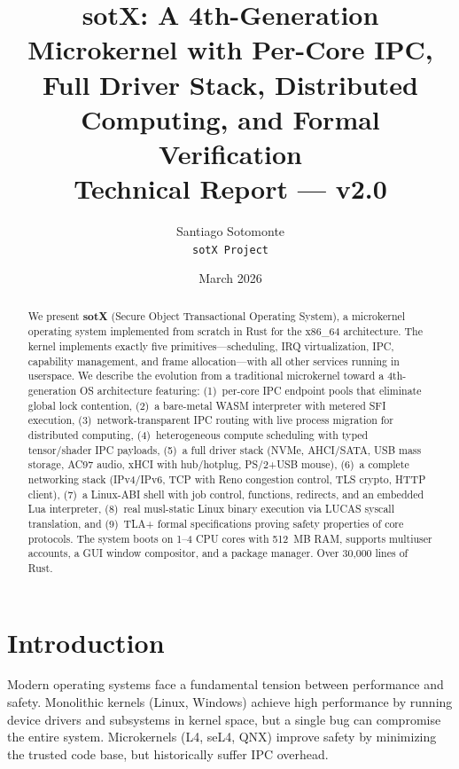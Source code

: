 \documentclass[11pt,letterpaper]{article}
\title{\textbf{sotX: A 4th-Generation Microkernel with Per-Core IPC,\\
Full Driver Stack, Distributed Computing, and Formal Verification}\\[0.5em]
\large Technical Report --- v2.0}
\author{Santiago Sotomonte\\
\texttt{sotX Project}}
\date{March 2026}
\theoremstyle{definition}
\begin{document}
\maketitle

\begin{abstract}
We present \textbf{sotX} (Secure Object Transactional Operating System), a
microkernel operating system implemented from scratch in Rust for the x86\_64
architecture. The kernel implements exactly five primitives---scheduling, IRQ
virtualization, IPC, capability management, and frame allocation---with all
other services running in userspace. We describe the evolution from a
traditional microkernel toward a 4th-generation OS architecture featuring:
(1)~per-core IPC endpoint pools that eliminate global lock contention,
(2)~a bare-metal WASM interpreter with metered SFI execution,
(3)~network-transparent IPC routing with live process migration for distributed computing,
(4)~heterogeneous compute scheduling with typed tensor/shader IPC payloads,
(5)~a full driver stack (NVMe, AHCI/SATA, USB mass storage, AC97 audio, xHCI with hub/hotplug, PS/2+USB mouse),
(6)~a complete networking stack (IPv4/IPv6, TCP with Reno congestion control, TLS crypto, HTTP client),
(7)~a Linux-ABI shell with job control, functions, redirects, and an embedded Lua interpreter,
(8)~real musl-static Linux binary execution via LUCAS syscall translation, and
(9)~TLA+ formal specifications proving safety properties of core protocols.
The system boots on 1--4 CPU cores with 512~MB RAM, supports multiuser accounts,
a GUI window compositor, and a package manager. Over 30,000 lines of Rust.
\end{abstract}

\tableofcontents
\newpage

\section{Introduction}

Modern operating systems face a fundamental tension between performance and
safety. Monolithic kernels (Linux, Windows) achieve high performance by running
device drivers and subsystems in kernel space, but a single bug can compromise
the entire system. Microkernels (L4, seL4, QNX) improve safety by minimizing
the trusted code base, but historically suffer IPC overhead.
\end{document}
